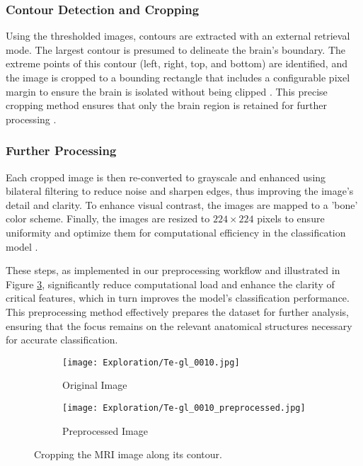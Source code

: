 \subsubsection{Contour Detection and Cropping}

Using the thresholded images, contours are extracted with an external retrieval mode. The largest contour is presumed to delineate the brain's boundary. The extreme points of this contour (left, right, top, and bottom) are identified, and the image is cropped to a bounding rectangle that includes a configurable pixel margin to ensure the brain is isolated without being clipped \cite{10.3389/fnhum.2023.1150120}. This precise cropping method ensures that only the brain region is retained for further processing \cite{Vimala_Srinivasan_Mathivanan_Mahalakshmi_Jayagopal_Dalu_2023}.

\subsubsection{Further Processing}

Each cropped image is then re-converted to grayscale and enhanced using bilateral filtering to reduce noise and sharpen edges, thus improving the image's detail and clarity. To enhance visual contrast, the images are mapped to a 'bone' color scheme. Finally, the images are resized to $224 \times 224$ pixels to ensure uniformity and optimize them for computational efficiency in the classification model \cite{9926057}.

These steps, as implemented in our preprocessing workflow and illustrated in Figure \ref{fig:image_cropping}, significantly reduce computational load and enhance the clarity of critical features, which in turn improves the model's classification performance. This preprocessing method effectively prepares the dataset for further analysis, ensuring that the focus remains on the relevant anatomical structures necessary for accurate classification.

\begin{figure}[H]
  \centering
  \begin{subfigure}[b]{0.3\textwidth}
    \centering
    \texttt{[image: Exploration/Te-gl\_0010.jpg]}
    \caption{Original Image}
    \label{fig:original_image}
  \end{subfigure}
  \begin{subfigure}[b]{0.3\textwidth}
    \centering
    \texttt{[image: Exploration/Te-gl\_0010\_preprocessed.jpg]}
    \caption{Preprocessed Image}
    \label{fig:preprocessed_image}
  \end{subfigure}
  \caption{Cropping the MRI image along its contour.}\label{fig:image_cropping}
\end{figure}



